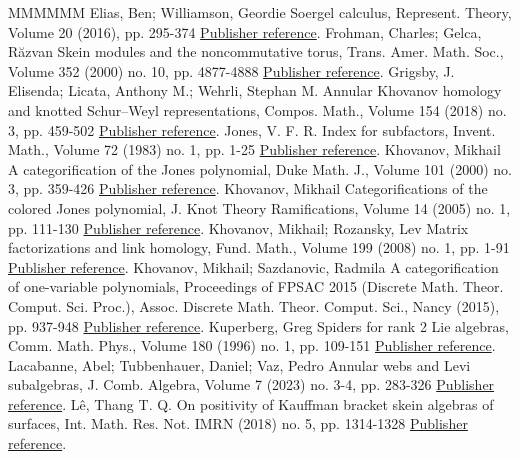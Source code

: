 \begin{thebibliography}{MMMMMM}
 Elias, Ben; Williamson, Geordie Soergel calculus, Represent. Theory, Volume 20 (2016), pp. 295-374 \href{https://alco.centre-mersenne.org/articles/10.5802/alco.330/#EW}{Publisher reference}.
 Frohman, Charles; Gelca, Răzvan Skein modules and the noncommutative torus, Trans. Amer. Math. Soc., Volume 352 (2000) no. 10, pp. 4877-4888 \href{https://alco.centre-mersenne.org/articles/10.5802/alco.330/#FG}{Publisher reference}.
 Grigsby, J. Elisenda; Licata, Anthony M.; Wehrli, Stephan M. Annular Khovanov homology and knotted Schur–Weyl representations, Compos. Math., Volume 154 (2018) no. 3, pp. 459-502 \href{https://alco.centre-mersenne.org/articles/10.5802/alco.330/#GLW}{Publisher reference}.
 Jones, V. F. R. Index for subfactors, Invent. Math., Volume 72 (1983) no. 1, pp. 1-25 \href{https://alco.centre-mersenne.org/articles/10.5802/alco.330/#Jon2}{Publisher reference}.
 Khovanov, Mikhail A categorification of the Jones polynomial, Duke Math. J., Volume 101 (2000) no. 3, pp. 359-426 \href{https://alco.centre-mersenne.org/articles/10.5802/alco.330/#Kh1}{Publisher reference}.
 Khovanov, Mikhail Categorifications of the colored Jones polynomial, J. Knot Theory Ramifications, Volume 14 (2005) no. 1, pp. 111-130 \href{https://alco.centre-mersenne.org/articles/10.5802/alco.330/#Kh7}{Publisher reference}.
 Khovanov, Mikhail; Rozansky, Lev Matrix factorizations and link homology, Fund. Math., Volume 199 (2008) no. 1, pp. 1-91 \href{https://alco.centre-mersenne.org/articles/10.5802/alco.330/#KhR}{Publisher reference}.
 Khovanov, Mikhail; Sazdanovic, Radmila A categorification of one-variable polynomials, Proceedings of FPSAC 2015 (Discrete Math. Theor. Comput. Sci. Proc.), Assoc. Discrete Math. Theor. Comput. Sci., Nancy (2015), pp. 937-948 \href{https://alco.centre-mersenne.org/articles/10.5802/alco.330/#KSa}{Publisher reference}.
 Kuperberg, Greg Spiders for rank 2 Lie algebras, Comm. Math. Phys., Volume 180 (1996) no. 1, pp. 109-151 \href{https://alco.centre-mersenne.org/articles/10.5802/alco.330/#Kup}{Publisher reference}.
 Lacabanne, Abel; Tubbenhauer, Daniel; Vaz, Pedro Annular webs and Levi subalgebras, J. Comb. Algebra, Volume 7 (2023) no. 3-4, pp. 283-326 \href{https://alco.centre-mersenne.org/articles/10.5802/alco.330/#LTV}{Publisher reference}.
 Lê, Thang T. Q. On positivity of Kauffman bracket skein algebras of surfaces, Int. Math. Res. Not. IMRN (2018) no. 5, pp. 1314-1328 \href{https://alco.centre-mersenne.org/articles/10.5802/alco.330/#Le}{Publisher reference}.

\end{thebibliography}
